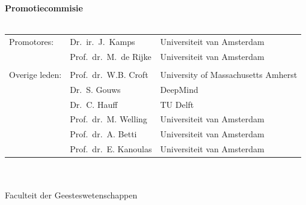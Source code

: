 {%
\clearpage
\noindent%
{\bf Promotiecommisie}\\
\\
\begin{tabular}[t]{@{}lll}
Promotores:      
& Dr.\ ir.\ J.~Kamps  & Universiteit van Amsterdam \\  
& Prof.\ dr.\ M.~de Rijke  & Universiteit van Amsterdam \\  

\\
Overige leden: 
& Prof.\ dr.\ W.B. Croft   &  University of Massachusetts Amherst \\ 
& Dr.\ S. Gouws  &  DeepMind \\ 
& Dr.\ C. Hauff   &   TU Delft \\ 
& Prof.\ dr.\ M. Welling    &  Universiteit van Amsterdam \\ 
& Prof.\ dr.\ A. Betti    &  Universiteit van Amsterdam \\ 
& Prof.\ dr.\ E. Kanoulas    &  Universiteit van Amsterdam \\ 

\end{tabular}\\
\\
Faculteit der Geesteswetenschappen \\ %
} %
\par\vspace {5cm}

